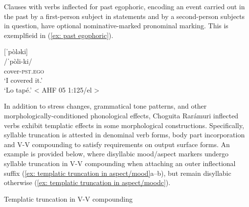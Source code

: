 Clauses with verbs inflected for past egophoric, encoding an event carried out in the past by a first-person subject in statements and by a second-person subjects in question, have optional nominative-marked pronominal marking. This is exemplfieid in (\ref{ex: past egophoric}).

\ea\label{ex: past egophoric}

[ˈpòləki]\\
\glt    /ˈpòli-ki/\\
\glt        cover-\textsc{pst.ego}\\
\glt    `I covered it.'\\
\glt    `Lo tapé.' < AHF 05 1:125/el >\\

\z

\largerpage
In addition to stress changes, grammatical tone patterns, and other morphol\-o\-gic\-ally-conditioned phonological effects, Choguita Rarámuri inflected verbs exhibit templatic effects in some morphological constructions. Specifically, syllable truncation is attested in denominal verb forms, body part incorporation and V-V compounding to satisfy requirements on output surface forms. An example is provided below, where disyllabic mood/aspect markers undergo syllable truncation in V-V compounding when attaching an outer inflectional suffix (\ref{ex: templatic truncation in aspect/mood}a--b), but remain disyllabic otherwise (\ref{ex: templatic truncation in aspect/moodc}).

\ea\label{ex: templatic truncation in aspect/mood}
{Templatic truncation in V-V compounding}

    \label{ex: templatic truncation in aspect/mooda}
        \label{ex: templatic truncation in aspect/moodb}
	        \label{ex: templatic truncation in aspect/moodc}
    \z
\z

